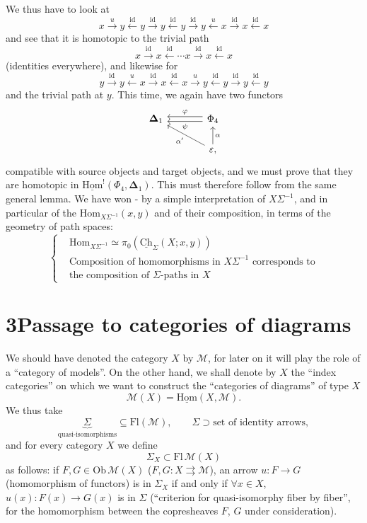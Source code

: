 \documentclass[11pt]{article}
\newcommand{\printedpage}[1]{\marginpar{\footnotesize p.~#1}}
\newcommand{\msp}[1]{\marginpar{\footnotesize [#1]}}
\newcommand{\uCh}{\underline{\mathrm{Ch}}}
\newcommand{\uHom}{\underline{\mathrm{Hom}}}
\newcommand{\bDelta}{\boldsymbol{\Delta}}
\newcommand{\Hom}{\mathrm{Hom}}
\begin{document}
We thus have to look at
\[
x \xrightarrow{u} y \xleftarrow{\mathrm{id}} y \xrightarrow{\mathrm{id}} y \xleftarrow{\mathrm{id}} y \xrightarrow{\mathrm{id}} y \xleftarrow{u} x \xrightarrow{\mathrm{id}} x \xleftarrow{\mathrm{id}} x
\]
and see that it is homotopic to the trivial path
\[
x \xrightarrow{\mathrm{id}} x \xleftarrow{\mathrm{id}} \cdots x \xrightarrow{\mathrm{id}} x \xleftarrow{\mathrm{id}} x
\]
(identities everywhere), and likewise for
\[
y \xrightarrow{\mathrm{id}} y \xleftarrow{u} x \xrightarrow{\mathrm{id}} x \xleftarrow{\mathrm{id}} x \xrightarrow{u} y \xleftarrow{\mathrm{id}} y \xrightarrow{\mathrm{id}} y \xleftarrow{\mathrm{id}} y
\]
and the trivial path at $y$. This time, we again have two functors
\[
\begin{tikzcd}[column sep=large]
\bDelta_1 & \Phi_4 \arrow[l, shift right, "\varphi"'] \arrow[l, shift left, "\psi"] \\
& \varepsilon, \arrow[ul, "\alpha'"] \arrow[u, "\alpha"']
\end{tikzcd}
\]
compatible with source objects and target objects, and we must prove that they are homotopic in $\uHom^!(\Phi_4, \bDelta_1)$. This must therefore follow from the same general lemma. We have won - by a simple interpretation of $X\Sigma^{-1}$, and in particular of the $\Hom_{X\Sigma^{-1}}(x,y)$ and of their composition, in terms of the geometry of path spaces:
\[
\left\{
\begin{aligned}
&\Hom_{X\Sigma^{-1}} \simeq \pi_0(\uCh_\Sigma(X;x,y)) \\ %
&\text{Composition of homomorphisms in } X\Sigma^{-1} \text{ corresponds to} \\
&\text{the composition of } \Sigma\text{-paths in } X
\end{aligned}
\right.
\]

\printedpage{18}
\noindent\msp{page 28}

\section*{3\quad Passage to categories of diagrams}

We should have denoted the category $X$ by $\mathcal{M}$, for later on it will play the role of a ``category of models''. On the other hand, we shall denote by $X$ the ``index categories'' on which we want to construct the ``categories of diagrams'' of type $X$
\[
\mathcal{M}(X) = \uHom(X,\mathcal{M}).
\]
We thus take
\[
\underbrace{\Sigma}_{\text{quasi-isomorphisms}} \subseteq \mathrm{Fl}(\mathcal{M}), \qquad \Sigma \supset \text{set of identity arrows},
\]
and for every category $X$ we define
\[
\Sigma_X \subset \mathrm{Fl}\,\mathcal{M}(X)
\]
as follows: if $F, G \in \mathrm{Ob}\,\mathcal{M}(X)$ ($F, G : X \rightrightarrows \mathcal{M}$), an arrow $u : F \longrightarrow G$ (homomorphism of functors) is in $\Sigma_X$ if and only if $\forall x \in X$, $u(x) : F(x) \longrightarrow G(x)$ is in $\Sigma$ (``criterion for quasi-isomorphy fiber by fiber'', for the homomorphism between the copresheaves $F$, $G$ under consideration). %
\end{document}

